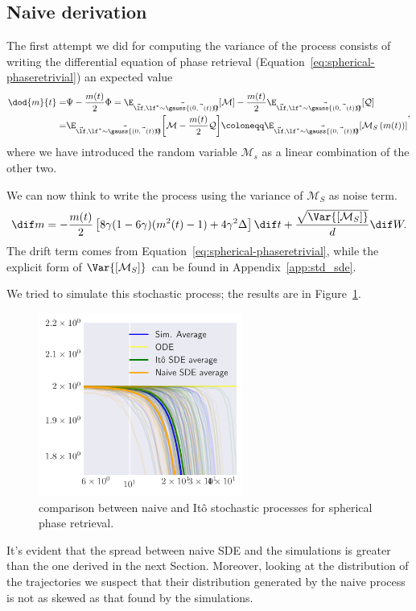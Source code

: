 \subsection{Naive derivation}
The first attempt we did for computing the variance of the process consists of writing 
the differential equation of phase retrieval (Equation~\eqref{eq:spherical-phaseretrivial}) an expected value 
\[\begin{split}
  \dod{m}{t} =& \Psi -\frac{m(t)}{2}\Phi = \E_{\vec{\lf},\vec{\lf^* \sim \gauss{(0,\vec{\Omega}{(t)})}}}{\left[\mathcal{M}\right]} - \frac{m(t)}{2}\E_{\vec{\lf},\vec{\lf^* \sim \gauss{(0,\vec{\Omega}{(t)})}}}{\left[\mathcal{Q}\right]} \\
             =& \E_{\vec{\lf},\vec{\lf^* \sim \gauss{(0,\vec{\Omega}{(t)})}}}{\left[\mathcal{M}-\frac{m(t)}{2}\mathcal{Q}\right]}
             \coloneqq \E_{\vec{\lf},\vec{\lf^* \sim \gauss{(0,\vec{\Omega}{(t)})}}}{\left[\mathcal{M}_S\left({m(t)}\right)\right]}
\end{split},\]
where we have introduced the random variable \(\mathcal{M}_s\) as a linear combination of the other two.

We can now think to write the process using the variance of \(\mathcal{M}_S\) as noise term.
\[
  \dif m = -\frac{m{(t)}}{2}\left[8\gamma(1-6\gamma)(m^2{(t)}-1)+4\gamma^2\Delta\right] \dif t
           + \frac{\sqrt{\Var{\left[\mathcal{M}_S\right]}}}{d}\dif W.
\]
The drift term comes from Equation~\eqref{eq:spherical-phaseretrivial}, while the explicit form of \(\Var{\left[\mathcal{M}_S\right]}\)
can be found in Appendix~\ref{app:std_sde}.

We tried to simulate this stochastic process; the results are in Figure~\ref{fig:naive_sde_pr}.
\begin{figure}
  \begin{center}
    \includegraphics[width=0.6\textwidth]{figures/sde/sde_naive.pdf}
  \end{center}
  \caption{comparison between naive and Itô stochastic processes for spherical phase retrieval.}
  \label{fig:naive_sde_pr}
\end{figure}
It's evident that the spread between naive SDE and the simulations is greater
than the one derived in the next Section. 
Moreover, looking at the distribution of the trajectories we suspect that their distribution generated by the naive process is not as skewed as that found by the simulations.

